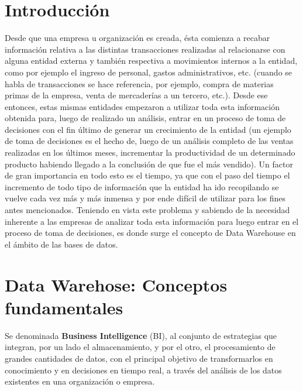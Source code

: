 \documentclass[a4paper,11pt]{article}
\begin{document}
  \newpage\null\thispagestyle{empty}\newpage
  
  \maketitle
  \tableofcontents

  \begin{flushleft}
    \section{Introducción}

    Desde que una empresa u organización es creada, ésta comienza a recabar información relativa a las distintas transacciones realizadas al relacionarse
    con alguna entidad externa y también respectiva a movimientos internos a la entidad, como por ejemplo el ingreso de personal, gastos administrativos,
    etc. (cuando se habla de transacciones se hace referencia, por ejemplo, compra de materias primas de la empresa, venta de mercaderías a un tercero,
    etc.). Desde ese entonces, estas mismas entidades empezaron a utilizar toda esta información obtenida para, luego de realizado un análisis, entrar en
    un proceso de toma de decisiones con el fin último de generar un crecimiento de la entidad (un ejemplo de toma de decisiones es el hecho de, luego de
    un análisis completo de las ventas realizadas en los últimos meses, incrementar la productividad de un determinado producto habiendo llegado a la
    conclusión de que fue el más vendido). Un factor de gran importancia en todo esto es el tiempo, ya que con el paso del tiempo el incremento de todo
    tipo de información que la entidad ha ido recopilando se vuelve cada vez más y más inmensa y por ende difícil de utilizar para los fines antes
    mencionados. Teniendo en vista este problema y sabiendo de la necesidad inherente a las empresas de analizar toda esta información para luego entrar
    en el proceso de toma de decisiones, es donde surge el concepto de Data Warehouse en el ámbito de las bases de datos.

    \vspace{0.5in}
    \section{Data Warehose: Conceptos fundamentales}
    
    Se denominada \textbf{Business Intelligence} (BI), al conjunto de estrategias que integran, por un lado el almacenamiento, y
    por el otro, el procesamiento de grandes cantidades de datos, con el principal objetivo de
    transformarlos en conocimiento y en decisiones en tiempo real, a través del análisis de los datos existentes en una organización o empresa.
    

\end{flushleft}
\end{document}
